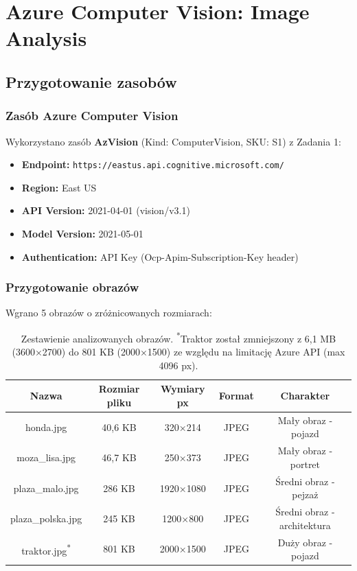 \section{Azure Computer Vision: Image Analysis}

\subsection{Przygotowanie zasobów}

\subsubsection{Zasób Azure Computer Vision}
Wykorzystano zasób \textbf{AzVision} (Kind: ComputerVision, SKU: S1) z Zadania 1:
\begin{itemize}
	\item \textbf{Endpoint:} \texttt{https://eastus.api.cognitive.microsoft.com/}
	\item \textbf{Region:} East US
	\item \textbf{API Version:} 2021-04-01 (vision/v3.1)
	\item \textbf{Model Version:} 2021-05-01
	\item \textbf{Authentication:} API Key (Ocp-Apim-Subscription-Key header)
\end{itemize}

\subsubsection{Przygotowanie obrazów}
Wgrano 5 obrazów o zróżnicowanych rozmiarach:

\begin{table}[H]
	\centering
	\begin{tabular}{|c|c|c|c|c|}
		\hline
		\textbf{Nazwa} & \textbf{Rozmiar pliku} & \textbf{Wymiary px} & \textbf{Format} & \textbf{Charakter} \\
		\hline
		honda.jpg & 40,6 KB & 320×214 & JPEG & Mały obraz - pojazd \\
		moza\_lisa.jpg & 46,7 KB & 250×373 & JPEG & Mały obraz - portret \\
		plaza\_malo.jpg & 286 KB & 1920×1080 & JPEG & Średni obraz - pejzaż \\
		plaza\_polska.jpg & 245 KB & 1200×800 & JPEG & Średni obraz - architektura \\
		traktor.jpg\textsuperscript{*} & 801 KB & 2000×1500 & JPEG & Duży obraz - pojazd \\
		\hline
	\end{tabular}
	\caption{Zestawienie analizowanych obrazów. \textsuperscript{*}Traktor został zmniejszony z 6,1 MB (3600×2700) do 801 KB (2000×1500) ze względu na limitację Azure API (max 4096 px).}
\end{table}

